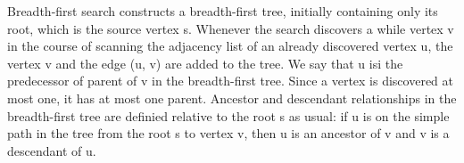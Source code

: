 \documentclass[preview]{standalone}
\begin{document}
\begin{center}
Breadth-first search constructs a breadth-first tree, initially containing only its root, which is the source vertex s. Whenever the search discovers a while vertex v in the course of scanning the adjacency list of an already discovered vertex u, the vertex v and the edge (u, v) are added to the tree. We say that u isi the predecessor of parent of v in the breadth-first tree. Since a vertex is discovered at most one, it has at most one parent. Ancestor and descendant relationships in the breadth-first tree are definied relative to the root s as usual: if u is on the simple path in the tree from the root s to vertex v, then u is an ancestor of v and v is a descendant of u.
\end{center}
\end{document}
